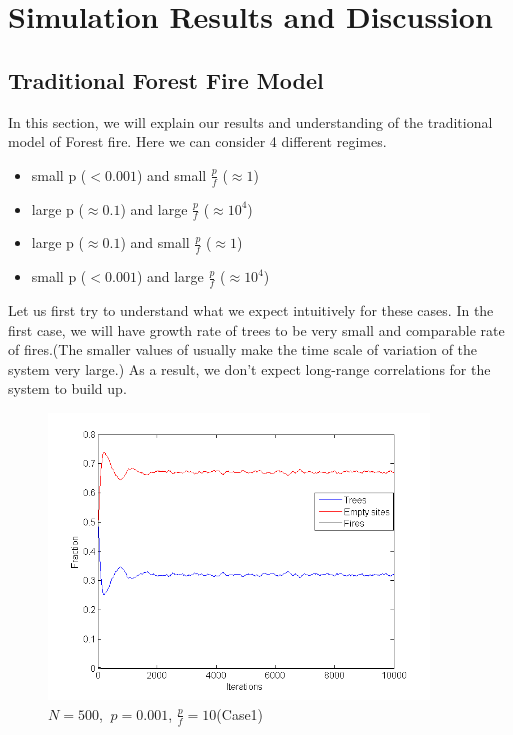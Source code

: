\documentclass[11pt]{article}
\begin{document}
\section{Simulation Results and Discussion}
\subsection{Traditional Forest Fire Model}

In this section, we will explain our results and understanding of the traditional model of Forest fire. Here we can consider 4 different regimes. 
\begin{itemize}
\item small p ($< 0.001$) and small $\frac{p}{f}$ ($\approx 1$)
\item large p ($\approx 0.1$) and large $\frac{p}{f}$ ($\approx 10^4$)
\item large p ($\approx 0.1$) and small $\frac{p}{f}$ ($\approx 1$)
\item small p ($< 0.001$) and large $\frac{p}{f}$ ($\approx 10^4$)
\end{itemize}

Let us first try to understand what we expect intuitively for these cases. In the first case, we will have growth rate of trees to be very small and comparable rate of fires.(The smaller values of usually make the time scale of variation of the system very large.) As a result, we don't expect long-range correlations for the system to build up.\\

\begin{figure}[H]
\centering
\includegraphics[width=0.9\textwidth,keepaspectratio=true,]{Pictures/case1_size_500.png}
\caption{$N=500$, $\ p=0.001$, $\frac{p}{f}=10$(Case1)}
\end{figure}
\end{document}
